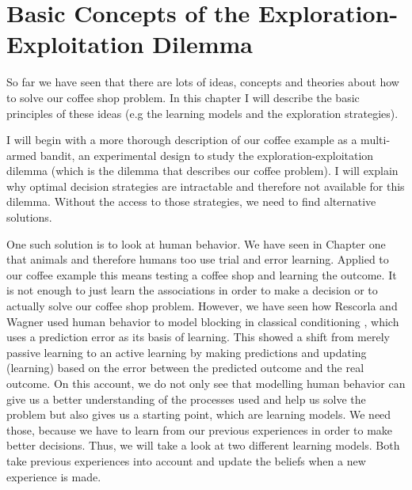 

\chapter{Basic Concepts of the Exploration-Exploitation Dilemma} \label{ch:explo}
So far we have seen that there are lots of ideas, concepts and theories about how to solve our coffee shop problem. In this chapter I will describe the basic principles of these ideas (e.g the learning models and the exploration strategies). 

I will begin with a more thorough description of our coffee example as a multi-armed bandit, an experimental design to study the exploration-exploitation dilemma (which is the dilemma that describes our coffee problem). I will explain why optimal decision strategies are intractable and therefore not available for this dilemma. Without the access to those strategies, we need to find alternative solutions.

One such solution is to look at human behavior. We have seen in Chapter one that animals and therefore humans too use trial and error learning. Applied to our coffee example this means testing a coffee shop and learning the outcome. It is not enough to just learn the associations in order to make a decision or to actually solve our coffee shop problem. 
However, we have seen how Rescorla and Wagner used human behavior to model blocking in classical conditioning \citep{rescorla1972theory}, which uses a prediction error as its basis of learning. This showed a shift from merely passive learning to an active learning by making predictions and updating (learning) based on the error between the predicted outcome and the real outcome. 
On this account, we do not only see that modelling human behavior can give us a better understanding of the processes used and help us solve the problem but also gives us a starting point, which are learning models. We need those, because we have to learn from our previous experiences in order to make better decisions.  
Thus, we will take a look at two different learning models. Both take previous experiences into account and update the beliefs when a new experience is made. 

